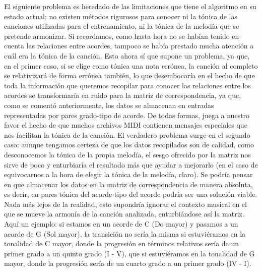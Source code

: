 El siguiente problema es heredado de las limitaciones que tiene el algoritmo en su estado actual: no existen métodos rigurosos para conocer ni la tónica de las canciones utilizadas para el entrenamiento, ni la tónica de la melodía que se pretende armonizar. Si recordamos, como hasta hora no se habían tenido en cuenta las relaciones entre acordes, tampoco se había prestado mucha atención a cuál era la tónica de la canción. Esto ahora sí que supone un problema, ya que, en el primer caso, si se elige como tónica una nota errónea, la canción al completo se relativizará de forma errónea también, lo que desembocaría en el hecho de que toda la información que queremos recopilar para conocer las relaciones entre los acordes se transformaría en ruido para la matriz de correspondencia, ya que, como se comentó anteriormente, los datos se almacenan en entradas representadas por pares grado-tipo de acorde. De todas formas, juega a nuestro favor el hecho de que muchos archivos MIDI contienen mensajes especiales que nos facilitan la tónica de la canción. El verdadero problema surge en el segundo caso: aunque tengamos certeza de que los datos recopilados son de calidad, como desconocemos la tónica de la propia melodía, el sesgo ofrecido por la matriz nos sirve de poco y enturbiaría el resultado más que ayudar a mejorarlo (en el caso de equivocarnos a la hora de elegir la tónica de la melodía, claro). Se podría pensar en que almacenar los datos en la matriz de correspondencia de manera absoluta, es decir, en pares tónica del acorde-tipo del acorde podría ser una solución viable. Nada más lejos de la realidad, esto supondría ignorar el contexto musical en el que se mueve la armonía de la canción analizada, enturbiándose así la matriz. Aquí un ejemplo: si estamos en un acorde de C (Do mayor) y pasamos a un acorde de G (Sol mayor), la transición no sería la misma si estuviéramos en la tonalidad de C mayor, donde la progresión en términos relativos sería de un primer grado a un quinto grado (I - V), que si estuviéramos en la tonalidad de G mayor, donde la progresión sería de un cuarto grado a un primer grado (IV - I).

